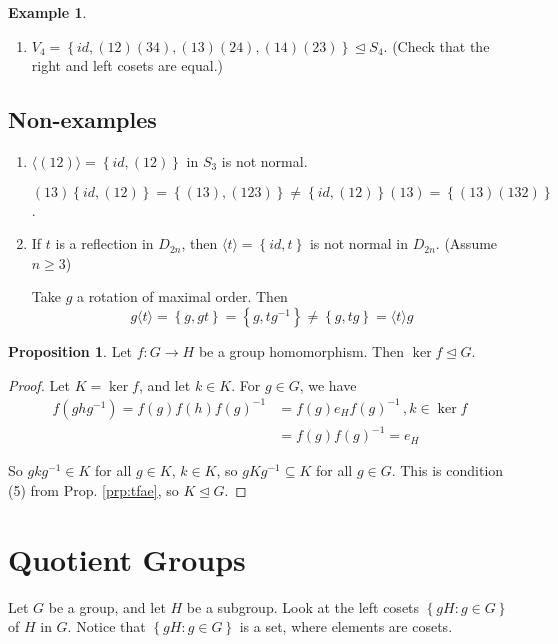 \documentclass{article}
\theoremstyle{definition}
\newtheorem{proposition}{Proposition}
\newtheorem*{exmp}{Example}
\newcommand{\gene}[1]{\langle #1 \rangle}
\newcommand{\func}[3]{#1 : #2 \rightarrow #3}
\begin{document}
\begin{exmp}
\begin{enumerate}
\item $V_4 = \left\{ id,(12)(34), (13)(24),(14)(23) \right\} \trianglelefteq S_4$. (Check that the right and left cosets are equal.)
  \end{enumerate}
\end{exmp}

\subsection*{Non-examples}
\begin{enumerate}
  \item $\gene{(12)}=\left\{ id,(12) \right\}$ in $S_3$ is not normal.

    $(13)\left\{ id, (12) \right\}=\left\{ (13),(123) \right\} \neq \left\{ id,(12) \right\}(13) = \left\{ (13)(132) \right\}$.

  \item If $t$ is a reflection in $D_{2n}$, then $\gene{t}=\left\{ id,t \right\}$ is not normal in $D_{2n}$. (Assume $n \geq 3$)

    Take $g$ a rotation of maximal order. Then 
    $$g\gene{t}=\left\{ g,gt \right\}=\left\{g,tg^{-1}\right\}\neq \left\{ g,tg \right\}=\gene{t}g$$
\end{enumerate}

\begin{proposition}
  Let $\func{f}{G}{H}$ be a group homomorphism. Then $\ker f \trianglelefteq G$. 
\end{proposition}

\begin{proof}
  Let $K = \ker f$, and let $k \in K$. For $g \in G$, we have 
  \begin{align*}
  f(ghg^{-1})=f(g)f(h)f(g)^{-1} &= f(g)e_Hf(g)^{-1} \,, k \in \ker f\\ &= f(g)f(g)^{-1} = e_H
  \end{align*}

  So $gkg^{-1} \in K$ for all $g \in K$, $k \in K$, so $gKg^{-1} \subseteq K$ for all $g \in G$. This is condition (5) from Prop. \ref{prp:tfae}, so $K \trianglelefteq G$.
\end{proof}

\section{Quotient Groups}
Let $G$ be a group, and let $H$ be a subgroup. Look at the left cosets $\left\{ gH:g\in G \right\}$ of $H$ in $G$. Notice that $\left\{ gH:g\in G \right\}$ is a set, where elements are cosets.
\end{document}
